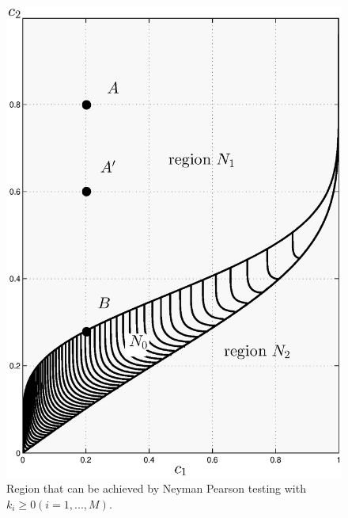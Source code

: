 \documentclass[12pt,journal,a4paper,twoside,onecolumn]{IEEEtran}
\begin{document}
\begin{spacing}{2.5}
\begin{figure}[!t]
\centering
\includegraphics[width=12cm]{singlecontour.eps}
\caption{Region that can be achieved by Neyman Pearson testing with $k_i \geq 0 (i=1, ..., M)$.}
\label{pic: contour for m0 gaussian}
\end{figure}


\end{spacing}
\end{document}
